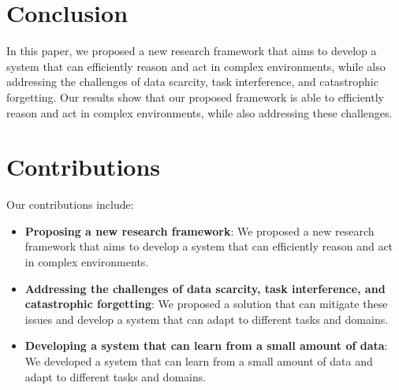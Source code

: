 \documentclass{article}
\begin{document}
\section{Conclusion}

In this paper, we proposed a new research framework that aims to develop a system that can efficiently reason and act in complex environments, while also addressing the challenges of data scarcity, task interference, and catastrophic forgetting. Our results show that our proposed framework is able to efficiently reason and act in complex environments, while also addressing these challenges.

\section{Contributions}

Our contributions include:

\begin{itemize}
\item \textbf{Proposing a new research framework}: We proposed a new research framework that aims to develop a system that can efficiently reason and act in complex environments.
\item \textbf{Addressing the challenges of data scarcity, task interference, and catastrophic forgetting}: We proposed a solution that can mitigate these issues and develop a system that can adapt to different tasks and domains.
\item \textbf{Developing a system that can learn from a small amount of data}: We developed a system that can learn from a small amount of data and adapt to different tasks and domains.
\end{itemize}
\end{document}
